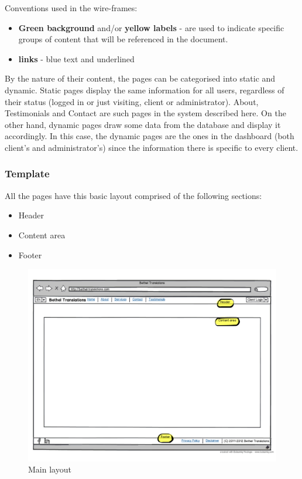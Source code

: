 \documentclass{l3proj}
\begin{document}
Conventions used in the wire-frames:
\begin{itemize} \itemsep1pt \parskip0pt 
	\item \textbf{Green background} and/or \textbf{yellow labels} - are used to
	indicate specific groups of content that will be referenced in the document.
	\item \textbf{links} - blue text and underlined
\end{itemize}

By the nature of their content, the pages can be categorised into static and
dynamic. Static pages display the same information for all users, regardless of
their status (logged in or just visiting, client or administrator). About,
Testimonials and Contact are such pages in the system described here. On the
other hand, dynamic pages draw some data from the database and display it
accordingly. In this case, the dynamic pages are the ones in the dashboard
(both client’s and administrator’s) since the information there is specific to
every client.



\subsubsection*{Template}
All the pages have this basic layout comprised of the following sections:
\begin{itemize} \itemsep1pt \parskip0pt 
	\item Header
	\item Content area
	\item Footer
\end{itemize}

\begin{figure}
\centering
\includegraphics[width=\linewidth, trim = 0px 50px 0px 50px]
	{wireframes/main-layout}
\caption{Main layout}
\label{wireframes-main-layout}
\end{figure}
\end{document}

